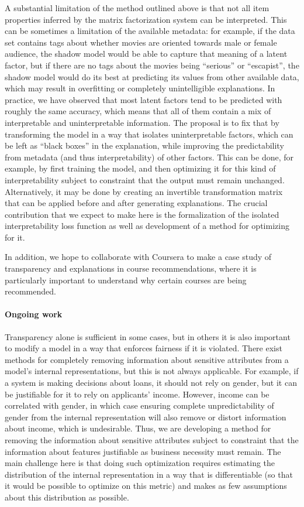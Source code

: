 A substantial limitation of the method outlined above is that not all
item properties inferred by the matrix factorization system can be interpreted.
This can be sometimes a limitation of the available metadata: for example,
if the data set contains tags about whether movies are oriented towards male or
female audience, the shadow model would be able to capture that meaning of a
latent factor, but if there are no tags about the movies being ``serious'' or
``escapist'', the shadow model would do its best at predicting its values from
other available data, which may result in overfitting or completely
unintelligible explanations. In practice, we have observed that most latent
factors tend to be predicted with roughly the same accuracy, which means that
all of them contain a mix of interpretable and uninterpretable information. The
proposal is to fix that by transforming the model in a way that isolates
uninterpretable factors, which can be left as ``black boxes'' in the
explanation, while improving the predictability from metadata (and thus
interpretability) of other factors. This can be done, for example, by first
training the model, and then optimizing it for this kind of interpretability
subject to constraint that the output must remain unchanged. Alternatively, it
may be done by creating an invertible transformation matrix that can be applied
before and after generating explanations. The crucial contribution that we
expect to make here is the formalization of the isolated interpretability loss
function as well as development of a method for optimizing for it.

In addition, we hope to collaborate with Coursera to make a case study of
transparency and explanations in course recommendations, where it is
particularly important to understand why certain courses are being recommended.

\paragraph{Ongoing work}

Transparency alone is sufficient in some cases, but in others it is also
important to modify a model in a way that enforces fairness if it is violated.
There exist methods for completely removing information about sensitive
attributes from a model's internal representations\cite{Beutel2017DataDA}, but
this is not always applicable. For example, if a system is making decisions
about loans, it should not rely on gender, but it can be justifiable for it to
rely on applicants' income. However, income can be correlated with gender, in
which case ensuring complete unpredictability of gender from the internal
representation will also remove or distort information about income, which is
undesirable. Thus, we are developing a method for removing the information
about sensitive attributes subject to constraint that the information about
features justifiable as business necessity must remain. The main challenge here
is that doing such optimization requires estimating the distribution of the
internal representation in a way that is differentiable (so that it would be
possible to optimize on this metric) and makes as few assumptions about this
distribution as possible.

